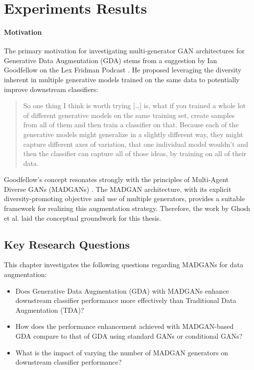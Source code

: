 \section{Experiments Results}\label{body_experiments_results}
\paragraph{Motivation}\label{par_EXP_durch_motiv}
The primary motivation for investigating multi-generator GAN architectures for Generative Data Augmentation (GDA) stems from a suggestion by Ian Goodfellow on the Lex Fridman Podcast \cite{fridman2019Goodfellow}. He proposed leveraging the diversity inherent in multiple generative models trained on the same data to potentially improve downstream classifiers:

\begin{quotation}
    \noindent So one thing I think is worth trying [\dots] is, what if you trained a whole lot of different generative models on the same training set, create samples from all of them and then train a classifier on that. Because each of the generative models might generalize in a slightly different way, they might capture different axes of variation, that one individual model wouldn't and then the classifier can capture all of those ideas, by training on all of their data.
\end{quotation}\citep[50:37]{fridman2019Goodfellow}

\noindent Goodfellow's concept resonates strongly with the principles of Multi-Agent Diverse GANs (MADGANs) \cite{ghosh2018madgan}. The MADGAN architecture, with its explicit diversity-promoting objective and use of multiple generators, provides a suitable framework for realizing this augmentation strategy. Therefore, the work by Ghosh et al. laid the conceptual groundwork for this thesis.

\subsection{Key Research Questions}
This chapter investigates the following questions regarding MADGANs for data augmentation:
\begin{itemize}
    \item Does Generative Data Augmentation (GDA) with MADGANs enhance downstream classifier performance more effectively than Traditional Data Augmentation (TDA)?
    \item How does the performance enhancement achieved with MADGAN-based GDA compare to that of GDA using standard GANs or conditional GANs?
    \item What is the impact of varying the number of MADGAN generators on downstream classifier performance? 
\end{itemize}




\newpage
